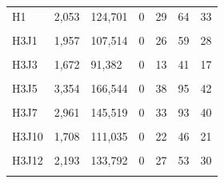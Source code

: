 \documentclass[
  a4paper,
  titlepage]{article}
\begin{document}
\begin{longtable}[t]{lllllll}
H1 & 2,053 & 124,701 & 0 & 29 & 64 & 33\\
 
\cellcolor{gray!6}{H3} & \cellcolor{gray!6}{1,544} & \cellcolor{gray!6}{94,891} & \cellcolor{gray!6}{0} & \cellcolor{gray!6}{20} & \cellcolor{gray!6}{43} & \cellcolor{gray!6}{16}\\
 
H3J1 & 1,957 & 107,514 & 0 & 26 & 59 & 28\\
 
\cellcolor{gray!6}{H3J2} & \cellcolor{gray!6}{1,351} & \cellcolor{gray!6}{106,147} & \cellcolor{gray!6}{0} & \cellcolor{gray!6}{15} & \cellcolor{gray!6}{47} & \cellcolor{gray!6}{20}\\
 
H3J3 & 1,672 & 91,382 & 0 & 13 & 41 & 17\\
 
\cellcolor{gray!6}{H3J4} & \cellcolor{gray!6}{1,442} & \cellcolor{gray!6}{98,347} & \cellcolor{gray!6}{0} & \cellcolor{gray!6}{15} & \cellcolor{gray!6}{37} & \cellcolor{gray!6}{19}\\
 
H3J5 & 3,354 & 166,544 & 0 & 38 & 95 & 42\\
 
\cellcolor{gray!6}{H3J6} & \cellcolor{gray!6}{2,076} & \cellcolor{gray!6}{134,575} & \cellcolor{gray!6}{0} & \cellcolor{gray!6}{19} & \cellcolor{gray!6}{64} & \cellcolor{gray!6}{26}\\
 
H3J7 & 2,961 & 145,519 & 0 & 33 & 93 & 40\\
 
\cellcolor{gray!6}{H3J8} & \cellcolor{gray!6}{2,357} & \cellcolor{gray!6}{123,177} & \cellcolor{gray!6}{0} & \cellcolor{gray!6}{24} & \cellcolor{gray!6}{54} & \cellcolor{gray!6}{27}\\
 
H3J10 & 1,708 & 111,035 & 0 & 22 & 46 & 21\\
 
\cellcolor{gray!6}{H3J11} & \cellcolor{gray!6}{2,602} & \cellcolor{gray!6}{127,480} & \cellcolor{gray!6}{0} & \cellcolor{gray!6}{33} & \cellcolor{gray!6}{89} & \cellcolor{gray!6}{32}\\
 
H3J12 & 2,193 & 133,792 & 0 & 27 & 53 & 30\\
 
\cellcolor{gray!6}{H3J13} & \cellcolor{gray!6}{2,608} & \cellcolor{gray!6}{134,403} & \cellcolor{gray!6}{0} & \cellcolor{gray!6}{29} & \cellcolor{gray!6}{85} & \cellcolor{gray!6}{29}\\
 

\end{longtable}
\end{document}
